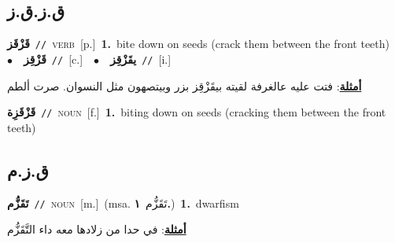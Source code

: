 \documentclass[10pt,a4paper,twoside]{article} %
\begin{document}
\begin{multicols}{2}
\vspace{-3mm}
\subsection*{\color{blue}\foreignlanguage{arabic}{ق.ز.ق.ز}\color{blue}{}} 

{\setlength\topsep{0pt}\textbf{\foreignlanguage{arabic}{قَزْقَز}}\ {\color{gray}\texttt{//}\color{black}}\ \textsc{verb}\ [p.]\ \textbf{1.}~bite down on seeds (crack them between the front teeth)\ \ $\bullet$\ \ \setlength\topsep{0pt}\textbf{\foreignlanguage{arabic}{قَزْقِز}}\ {\color{gray}\texttt{//}\color{black}}\ [c.]\ \ $\bullet$\ \ \setlength\topsep{0pt}\textbf{\foreignlanguage{arabic}{يقَزْقِز}}\ {\color{gray}\texttt{//}\color{black}}\ [i.]\  \begin{flushright}\color{gray}\foreignlanguage{arabic}{\textbf{\underline{\foreignlanguage{arabic}{أمثلة}}}: فتت عليه عالغرفة لقيته بيقَزْقِز بزر وبيتصهون مثل النسوان. صرت ألطم}\end{flushright}\color{black}} \vspace{2mm}

{\setlength\topsep{0pt}\textbf{\foreignlanguage{arabic}{قَزْقَزِة}}\ {\color{gray}\texttt{//}\color{black}}\ \textsc{noun}\ [f.]\ \textbf{1.}~biting down on seeds (cracking them between the front teeth)\ } \vspace{2mm}

\vspace{-3mm}
\subsection*{\color{blue}\foreignlanguage{arabic}{ق.ز.م}\color{blue}{}} 

{\setlength\topsep{0pt}\textbf{\foreignlanguage{arabic}{تَقَزُّم}}\ {\color{gray}\texttt{//}\color{black}}\ \textsc{noun}\ [m.]\ \color{gray}(msa. \foreignlanguage{arabic}{تَقَزُّم}~\foreignlanguage{arabic}{\textbf{١.}})\color{black}\ \textbf{1.}~dwarfism\  \begin{flushright}\color{gray}\foreignlanguage{arabic}{\textbf{\underline{\foreignlanguage{arabic}{أمثلة}}}: في حدا من زلادها معه داء التَّقَزُّم}\end{flushright}\color{black}} \vspace{2mm}


\end{multicols}
\end{document}
